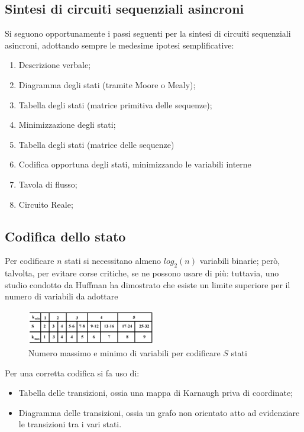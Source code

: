 \documentclass[a4paper]{extarticle}
\begin{document}
\vspace{1em}
\noindent
\subsection{Sintesi di circuiti sequenziali asincroni}
Si seguono opportunamente i passi seguenti per la sintesi di circuiti sequenziali asincroni, adottando sempre le medesime ipotesi semplificative:
\begin{enumerate}
    \item Descrizione verbale;
    \item Diagramma degli stati (tramite Moore o Mealy);
    \item Tabella degli stati (matrice primitiva delle sequenze);
    \item Minimizzazione degli stati;
    \item Tabella degli stati (matrice delle sequenze)
    \item Codifica opportuna degli stati, minimizzando le variabili interne
    \item Tavola di flusso;
    \item Circuito Reale;    
\end{enumerate}

\vspace{1em}
\subsection{Codifica dello stato}
Per codificare $n$ stati si necessitano almeno $log_2(n)$ variabili binarie; però, talvolta, per evitare corse critiche, se ne possono usare di più: tuttavia, uno studio condotto da Huffman ha dimostrato che esiste un limite superiore per il numero di variabili da adottare

\begin{figure}[H]
    \centering
    \includegraphics[width=0.50\textwidth]{numero-massimo-minimo-codifica-variabili.png}
    \caption{Numero massimo e minimo di variabili per codificare $S$ stati}
    \label{fig:numero_massimo_minimo_codicia_variabili}
\end{figure}

\vspace{1em}
\noindent
Per una corretta codifica si fa uso di:
\begin{itemize}
    \item Tabella delle transizioni, ossia una mappa di Karnaugh priva di coordinate;
    \item Diagramma delle transizioni, ossia un grafo non orientato atto ad evidenziare le transizioni tra i vari stati.
\end{itemize}
\end{document}
